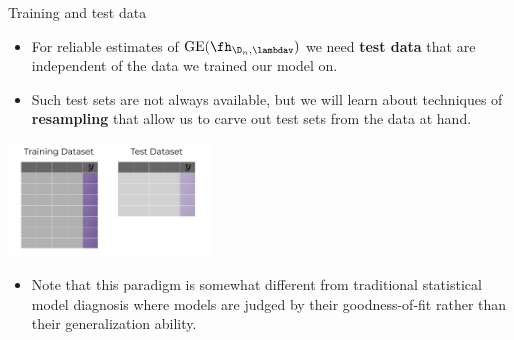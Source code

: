 \documentclass[11pt,compress,t,notes=noshow, xcolor=table]{beamer}
\begin{document}

\begin{vbframe}{Training and test data}

\begin{itemize}
  \item For reliable estimates of $\mathrm{GE}(\fh_{\D_n, \lambdav})$ we need 
  \textbf{test data} that are independent of the data we trained our model on.
  \item Such test sets are not always available, but we will learn about 
  techniques of \textbf{resampling} that allow us to carve out test sets from 
  the data at hand.
\end{itemize}

\begin{center}
  \includegraphics[width=0.4\textwidth]{figure_man/train-test-data.jpg}
\end{center}

\begin{itemize}
  \item Note that this paradigm is somewhat different from traditional 
  statistical model diagnosis where models are judged by their goodness-of-fit 
  rather than their generalization ability.
\end{itemize}

\end{vbframe}


\endlecture
\end{document}
